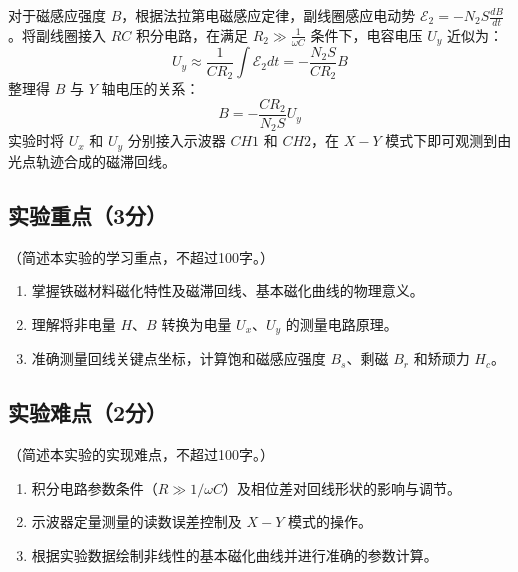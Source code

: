 \documentclass{../../templates/Report}%
\begin{document}
对于磁感应强度 $B$，根据法拉第电磁感应定律，副线圈感应电动势 $\mathcal{E}_2 = -N_2 S \frac{dB}{dt}$。将副线圈接入 $RC$ 积分电路，在满足 $R_2 \gg \frac{1}{\omega C}$ 条件下，电容电压 $U_y$ 近似为：
\begin{equation}
    U_y \approx \frac{1}{C R_2} \int \mathcal{E}_2 dt = -\frac{N_2 S}{C R_2} B
\end{equation}
整理得 $B$ 与 $Y$ 轴电压的关系：
\begin{equation}
    B = -\frac{C R_2}{N_2 S} U_y
\end{equation}
实验时将 $U_x$ 和 $U_y$ 分别接入示波器 $CH1$ 和 $CH2$，在 $X-Y$ 模式下即可观测到由光点轨迹合成的磁滞回线。

\subsection{实验重点（3分）}
（简述本实验的学习重点，不超过100字。）

\begin{enumerate}
    \item 掌握铁磁材料磁化特性及磁滞回线、基本磁化曲线的物理意义。
    \item 理解将非电量 $H、B$ 转换为电量 $U_x、U_y$ 的测量电路原理。
    \item 准确测量回线关键点坐标，计算饱和磁感应强度 $B_s$、剩磁 $B_r$ 和矫顽力 $H_c$。
\end{enumerate}

\subsection{实验难点（2分）}
（简述本实验的实现难点，不超过100字。）

\begin{enumerate}
    \item 积分电路参数条件（$R \gg 1/\omega C$）及相位差对回线形状的影响与调节。
    \item 示波器定量测量的读数误差控制及 $X-Y$ 模式的操作。
    \item 根据实验数据绘制非线性的基本磁化曲线并进行准确的参数计算。
\end{enumerate}
\end{document}
